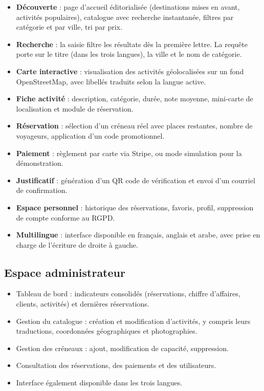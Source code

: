 \documentclass[11pt,a4paper]{report}
\begin{document}
\begin{itemize}
  \item \textbf{Découverte} : page d'accueil éditorialisée (destinations mises
    en avant, activités populaires), catalogue avec recherche instantanée,
    filtres par catégorie et par ville, tri par prix.
  \item \textbf{Recherche} : la saisie filtre les résultats dès la première
    lettre. La requête porte sur le titre (dans les trois langues), la ville et
    le nom de catégorie.
  \item \textbf{Carte interactive} : visualisation des activités géolocalisées
    sur un fond OpenStreetMap, avec libellés traduits selon la langue active.
  \item \textbf{Fiche activité} : description, catégorie, durée, note moyenne,
    mini-carte de localisation et module de réservation.
  \item \textbf{Réservation} : sélection d'un créneau réel avec places
    restantes, nombre de voyageurs, application d'un code promotionnel.
  \item \textbf{Paiement} : règlement par carte via Stripe, ou mode simulation
    pour la démonstration.
  \item \textbf{Justificatif} : génération d'un QR code de vérification et envoi
    d'un courriel de confirmation.
  \item \textbf{Espace personnel} : historique des réservations, favoris,
    profil, suppression de compte conforme au RGPD.
  \item \textbf{Multilingue} : interface disponible en français, anglais et
    arabe, avec prise en charge de l'écriture de droite à gauche.
\end{itemize}

\subsection{Espace administrateur}

\begin{itemize}
  \item Tableau de bord : indicateurs consolidés (réservations, chiffre
    d'affaires, clients, activités) et dernières réservations.
  \item Gestion du catalogue : création et modification d'activités, y compris
    leurs traductions, coordonnées géographiques et photographies.
  \item Gestion des créneaux : ajout, modification de capacité, suppression.
  \item Consultation des réservations, des paiements et des utilisateurs.
  \item Interface également disponible dans les trois langues.
\end{itemize}
\end{document}
